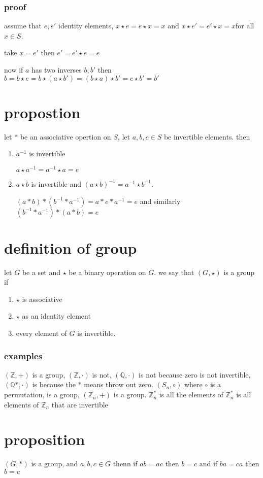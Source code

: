 \documentclass[letterpaper]{article}
\begin{document}
\subsubsection*{proof}
assume that $e,e'$ identity elements, $x\star e=e\star x=x$ and $x\star e'=e'\star x=x$for all $x\in S$.

take $x=e'$ then $e'=e'\star e=e$

now if $a$ has two inverses $b,b'$ then $b=b\star e=b\star (a\star b')=(b\star a)\star b'=e\star b'=b'$

\section*{propostion}
let $*$ be an associative opertion on $S$, let $a,b,c\in S$ be invertible elements. then
\begin{enumerate}
\item
$a^{-1}$ is invertible

$a\star a^{-1}=a^{-1}\star a=e$
\item
$a\star b$ is invertible and $(a\star b)^{-1}=a^{-1}\star b^{-1}$.

$(a*b)*(b^{-1}*a^{-1})=a*e*a^{-1}=e$ and similarly $(b^{-1}*a^{-1})*(a*b)=e$
\end{enumerate}

\section*{definition of group}
let $G$ be a set and $\star$ be a binary operation on $G$. we say that $(G,\star)$ is a group if
\begin{enumerate}
\item
$\star$ is associative
\item
$\star$ as an identity element
\item
every element of $G$ is invertible.
\end{enumerate}
\subsubsection*{examples}
$(\mathbb{Z},+)$ is a group, $(\mathbb{Z},\cdot)$ is not, $(\mathbb{Q},\cdot)$ is not because zero is not invertible, $(\mathbb{Q}*,\cdot)$ is because the $*$ means throw out zero. $(S_n,\circ)$ where $\circ$ is a permutation, is a group, $(\mathbb{Z}_n,+)$ is a group. $\mathbb{Z}_n^*$ is all the elements of $\mathbb{Z}_n^*$ is all elements of $\mathbb{Z}_n$ that are invertible

\section*{proposition}
$(G,*)$ is a group, and $a,b,c\in G$ thenn if $ab=ac$ then $b=c$ and if $ba=ca$ then $b=c$
\end{document}
